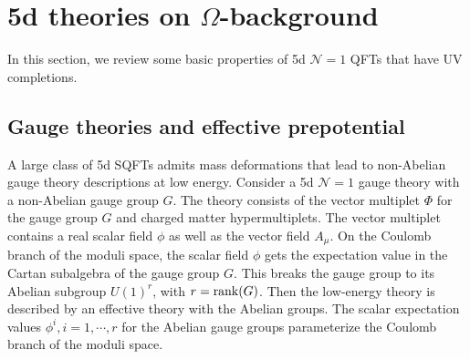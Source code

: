\section{\texorpdfstring{5d theories on $\Omega$-background}{5d theories on Omega-background}}\label{sec:5dthyOmega}

In this section, we review some basic properties of 5d $\mathcal{N}=1$ QFTs that have UV completions. 


\subsection{Gauge theories and effective prepotential}

A large class of 5d SQFTs admits mass deformations that lead to non-Abelian gauge theory descriptions at low energy. Consider a 5d $\mathcal{N}=1$ gauge theory with a non-Abelian gauge group $G$. The theory consists of the vector multiplet $\Phi$ for the gauge group $G$ and charged matter hypermultiplets. The vector multiplet contains a real scalar field $\phi$ as well as the vector field $A_\mu$. On the Coulomb branch of the moduli space, the scalar field $\phi$ gets the expectation value in the Cartan subalgebra of the gauge group $G$. This breaks the gauge group to its Abelian subgroup $U(1)^r$, with $r={\rm rank}(G)$. Then the low-energy theory is described by an effective theory with the Abelian groups. The scalar expectation values $\phi^i, i=1,\cdots, r$ for the Abelian gauge groups parameterize the Coulomb branch of the moduli space. 

